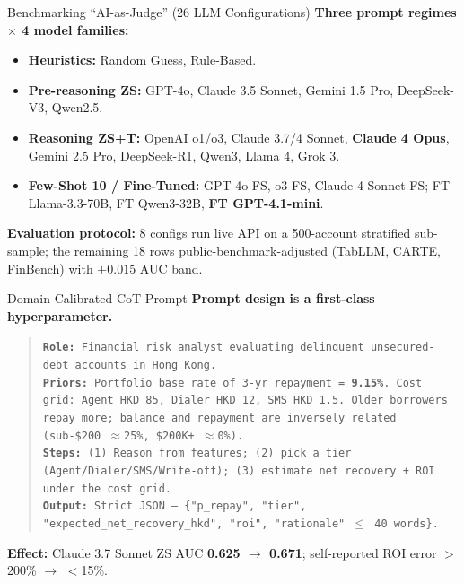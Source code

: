 \documentclass[10pt]{beamer}
\begin{document}
\begin{frame}{\textrm{Benchmarking ``AI-as-Judge'' (26 LLM Configurations)}}
    \textbf{Three prompt regimes $\times$ 4 model families:}
    \begin{itemize}
        \item \textbf{Heuristics:} Random Guess, Rule-Based.
        \item \textbf{Pre-reasoning ZS:} GPT-4o, Claude 3.5 Sonnet, Gemini 1.5 Pro, DeepSeek-V3, Qwen2.5.
        \item \textbf{Reasoning ZS+T:} OpenAI o1/o3, Claude 3.7/4 Sonnet, \textbf{Claude 4 Opus}, Gemini 2.5 Pro, DeepSeek-R1, Qwen3, Llama 4, Grok 3.
        \item \textbf{Few-Shot 10 / Fine-Tuned:} GPT-4o FS, o3 FS, Claude 4 Sonnet FS; FT Llama-3.3-70B, FT Qwen3-32B, \textbf{FT GPT-4.1-mini}.
    \end{itemize}
    \vspace{0.15cm}
    \textbf{Evaluation protocol:} 8 configs run live API on a 500-account stratified sub-sample; the remaining 18 rows public-benchmark-adjusted (TabLLM, CARTE, FinBench) with $\pm 0.015$ AUC band.
\end{frame}

\begin{frame}{\textrm{Domain-Calibrated CoT Prompt}}
    \textbf{Prompt design is a first-class hyperparameter.}
    \vspace{-0.05cm}
    \begin{quote}
    \tiny
    \texttt{\textbf{Role:} Financial risk analyst evaluating delinquent unsecured-debt accounts in Hong Kong.}\\
    \texttt{\textbf{Priors:} Portfolio base rate of 3-yr repayment = \textbf{9.15\%}. Cost grid: Agent HKD\,85, Dialer HKD\,12, SMS HKD\,1.5. Older borrowers repay more; balance and repayment are inversely related (sub-\$200 $\approx$25\%, \$200K+ $\approx$0\%).}\\
    \texttt{\textbf{Steps:} (1) Reason from features; (2) pick a tier (Agent/Dialer/SMS/Write-off); (3) estimate net recovery + ROI under the cost grid.}\\
    \texttt{\textbf{Output:} Strict JSON --- \{"p\_repay", "tier", "expected\_net\_recovery\_hkd", "roi", "rationale" $\le$ 40 words\}.}
    \end{quote}
    \vspace{-0.1cm}
    \textbf{Effect:} Claude 3.7 Sonnet ZS AUC \textbf{0.625 $\to$ 0.671}; self-reported ROI error $>$200\% $\to$ $<$15\%.
\end{frame}
\end{document}
